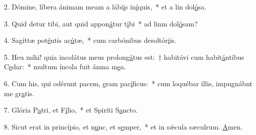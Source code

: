 2. Dómine, líbera ánimam meam a lábi\uline{i}s in\uline{í}quis,~* et a lin dol\uline{ó}sa.\par 
3. Quid detur tibi, aut quid appon\uline{á}tur t\uline{i}bi~* ad linm dol\uline{ó}sam?\par 
4. Sagíttæ pot\uline{é}ntis ac\uline{ú}tæ,~* cum carbónibus desoltór\uline{i}is.\par 
5. Heu mihi! quia incolátus meus prolon\uline{gá}tus est:~† habitávi cum habit\uline{á}ntibus C\uline{e}dar:~* multum íncola fuit ánma m\uline{e}a.\par 
6. Cum his, qui odérunt pacem, \uline{e}ram pac\uline{í}ficus:~* cum loquébar illis, impugnábnt me gr\uline{a}tis.\par 
7. Glória P\uline{a}tri, et F\uline{í}lio,~* et Spiríti S\uline{a}ncto.\par 
8. Sicut erat in princípio, et n\uline{u}nc, et s\uline{e}mper,~* et in sǽcula sæculrum. \uline{A}men.\par 
